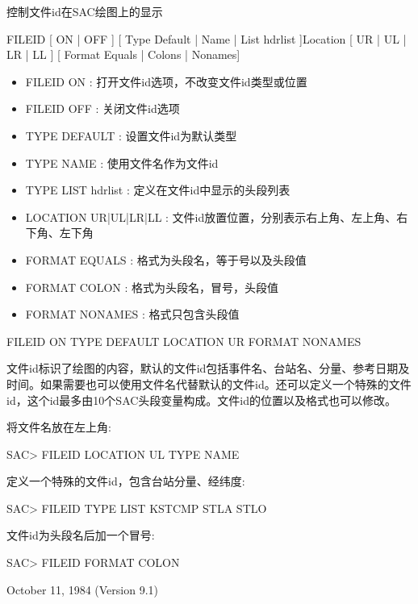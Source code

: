 \label{cmd:fileid}

控制文件id在SAC绘图上的显示

FILEID [ ON | OFF ] [ Type Default | Name | List hdrlist ]Location [ UR | UL | LR | LL ] [ Format Equals | Colons | Nonames]

\begin{itemize}
\item FILEID ON : 打开文件id选项，不改变文件id类型或位置 
\item FILEID OFF : 关闭文件id选项 
\item TYPE DEFAULT : 设置文件id为默认类型 
\item TYPE NAME : 使用文件名作为文件id 
\item TYPE LIST hdrlist : 定义在文件id中显示的头段列表 
\item LOCATION UR|UL|LR|LL : 文件id放置位置，分别表示右上角、左上角、右下角、左下角
\item FORMAT EQUALS : 格式为头段名，等于号以及头段值 
\item FORMAT COLON : 格式为头段名，冒号，头段值 
\item FORMAT NONAMES : 格式只包含头段值 
\end{itemize}

FILEID ON TYPE DEFAULT LOCATION UR FORMAT NONAMES

文件id标识了绘图的内容，默认的文件id包括事件名、台站名、分量、参考日期及时间。如果需要也可以使用文件名代替默认的文件id。还可以定义一个特殊的文件id，这个id最多由10个SAC头段变量构成。文件id的位置以及格式也可以修改。

将文件名放在左上角:
\begin{SACCode}
SAC> FILEID LOCATION UL TYPE NAME
\end{SACCode}

定义一个特殊的文件id，包含台站分量、经纬度:
\begin{SACCode}
SAC> FILEID TYPE LIST KSTCMP STLA STLO
\end{SACCode}

文件id为头段名后加一个冒号:
\begin{SACCode}
SAC> FILEID FORMAT COLON
\end{SACCode}

October 11, 1984 (Version 9.1)

